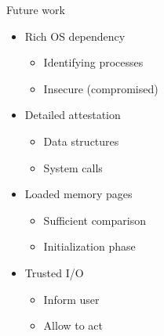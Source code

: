 \documentclass[]{beamer}
\begin{document}
\begin{frame}{Future work}
\begin{itemize}
\item Rich OS dependency \begin{itemize}
\item Identifying processes
\item Insecure (compromised)
\end{itemize}
\item Detailed attestation \begin{itemize}
\item Data structures
\item System calls
\end{itemize}
\item Loaded memory pages \begin{itemize}
\item Sufficient comparison
\item Initialization phase
\end{itemize}
\item Trusted I/O \begin{itemize}
\item Inform user
\item Allow to act
\end{itemize}
\end{itemize}
\end{frame}

\part{}
\end{document}
